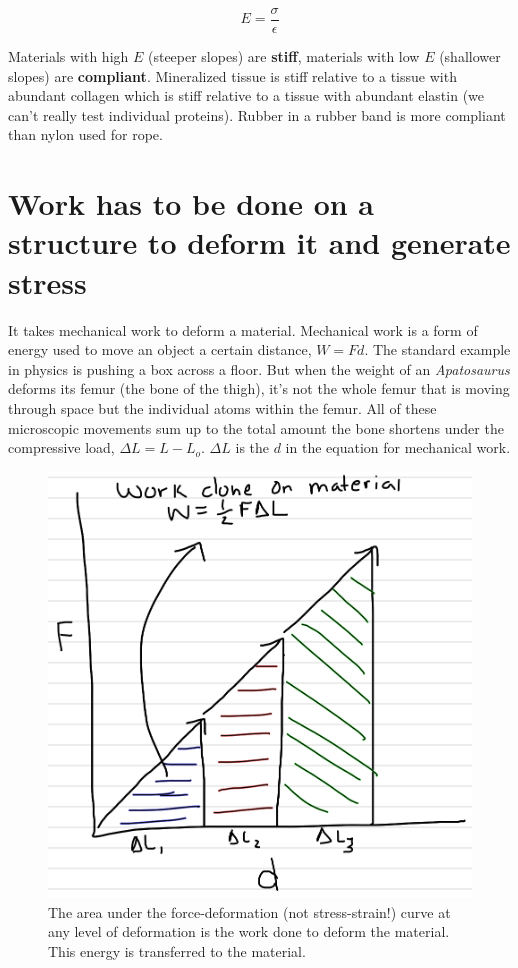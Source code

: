 \documentclass[]{book}
\begin{document}
\[E = \frac{\sigma}{\epsilon}\]

Materials with high \(E\) (steeper slopes) are \textbf{stiff}, materials
with low \(E\) (shallower slopes) are \textbf{compliant}. Mineralized
tissue is stiff relative to a tissue with abundant collagen which is
stiff relative to a tissue with abundant elastin (we can't really test
individual proteins). Rubber in a rubber band is more compliant than
nylon used for rope.

\section{Work has to be done on a structure to deform it and generate
stress}\label{work-has-to-be-done-on-a-structure-to-deform-it-and-generate-stress}

It takes mechanical work to deform a material. Mechanical work is a form
of energy used to move an object a certain distance, \(W=Fd\). The
standard example in physics is pushing a box across a floor. But when
the weight of an \emph{Apatosaurus} deforms its femur (the bone of the
thigh), it's not the whole femur that is moving through space but the
individual atoms within the femur. All of these microscopic movements
sum up to the total amount the bone shortens under the compressive load,
\(\Delta L = L - L_o\). \(\Delta L\) is the \(d\) in the equation for
mechanical work.

\begin{figure}
\centering
\includegraphics{images/materials_chapter/work.png}
\caption{\label{fig:unnamed-chunk-9}The area under the force-deformation
(not stress-strain!) curve at any level of deformation is the work done
to deform the material. This energy is transferred to the material.}
\end{figure}
\end{document}
